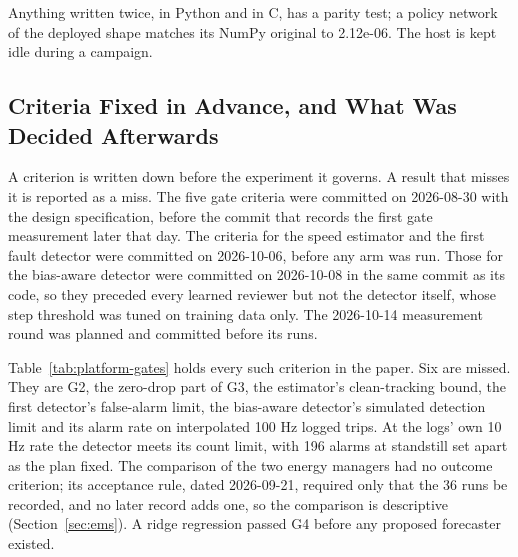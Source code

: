 \documentclass{ieeeaccess}
\begin{document}
Anything written twice, in Python and in C, has a parity test; a policy network of the deployed shape matches its NumPy original to 2.12e-06. The host is kept idle during a campaign.

\subsection{Criteria Fixed in Advance, and What Was Decided Afterwards}

A criterion is written down before the experiment it governs. A result that misses it is reported as a miss. The five gate criteria were committed on 2026-08-30 with the design specification, before the commit that records the first gate measurement later that day. The criteria for the speed estimator and the first fault detector were committed on 2026-10-06, before any arm was run. Those for the bias-aware detector were committed on 2026-10-08 in the same commit as its code, so they preceded every learned reviewer but not the detector itself, whose step threshold was tuned on training data only. The 2026-10-14 measurement round was planned and committed before its runs.

Table~\ref{tab:platform-gates} holds every such criterion in the paper. Six are missed. They are G2, the zero-drop part of G3, the estimator's clean-tracking bound, the first detector's false-alarm limit, the bias-aware detector's simulated detection limit and its alarm rate on interpolated 100 Hz logged trips. At the logs' own 10 Hz rate the detector meets its count limit, with 196 alarms at standstill set apart as the plan fixed. The comparison of the two energy managers had no outcome criterion; its acceptance rule, dated 2026-09-21, required only that the 36 runs be recorded, and no later record adds one, so the comparison is descriptive (Section~\ref{sec:ems}). A ridge regression passed G4 before any proposed forecaster existed.
\end{document}
